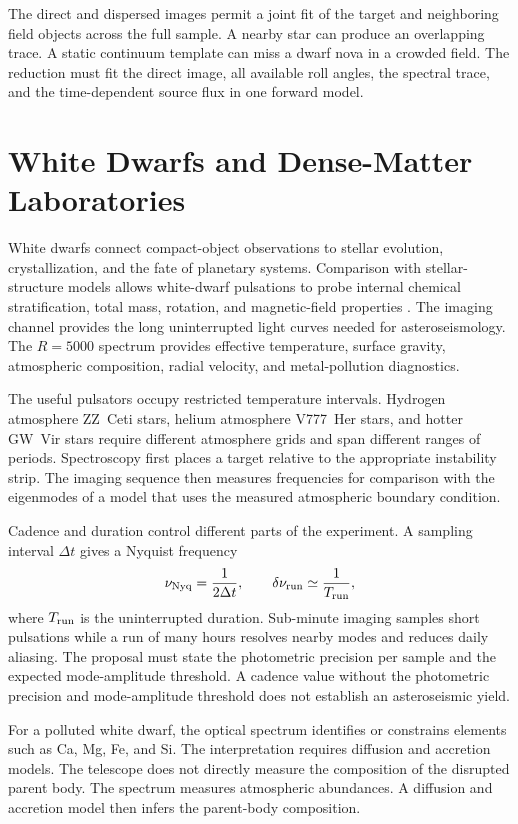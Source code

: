 \documentclass[10pt,onecolumn]{article}
\begin{document}
The direct and dispersed images permit a joint fit of the target and
neighboring field objects across the full sample. A nearby star can produce an
overlapping trace. A static continuum template can miss a dwarf nova in a
crowded field. The reduction must
fit the direct image, all available roll angles, the spectral trace,
and the time-dependent source flux in one forward model.

\section{White Dwarfs and Dense-Matter Laboratories}

White dwarfs connect compact-object observations to stellar evolution,
crystallization, and the fate of planetary systems. Comparison with
stellar-structure models allows white-dwarf pulsations to probe internal
chemical stratification, total mass, rotation, and magnetic-field properties
\cite{corsico2019}. The imaging channel provides the long uninterrupted light
curves needed for asteroseismology. The $R=5000$ spectrum provides effective
temperature, surface gravity, atmospheric composition, radial velocity, and
metal-pollution diagnostics.

The useful pulsators occupy restricted temperature intervals. Hydrogen
atmosphere ZZ~Ceti stars, helium atmosphere V777~Her stars, and hotter
GW~Vir stars require different atmosphere grids and span different ranges of
periods. Spectroscopy first places a target relative to the appropriate
instability strip. The imaging sequence then measures frequencies for
comparison with the eigenmodes of a model that uses the measured atmospheric
boundary condition.

Cadence and duration control different parts of the experiment. A sampling
interval $\Delta t$ gives a Nyquist frequency
\begin{equation}
 \nu_{\rm Nyq}=\frac{1}{2\Delta t},
 \qquad
 \delta\nu_{\rm run}\simeq\frac{1}{T_{\rm run}},
 \label{eq:wd_sampling}
\end{equation}
where $T_{\rm run}$ is the uninterrupted duration. Sub-minute imaging
samples short pulsations while a run of many hours resolves nearby modes and
reduces daily aliasing. The proposal must state the photometric precision per
sample and the expected mode-amplitude threshold. A cadence value without the
photometric precision and mode-amplitude threshold does not establish an
asteroseismic yield.

For a polluted white dwarf, the optical spectrum identifies or constrains
elements such as Ca, Mg, Fe, and Si. The interpretation requires diffusion and
accretion models. The telescope does not directly measure the composition of
the disrupted parent body. The spectrum measures atmospheric abundances. A
diffusion and accretion model then infers the parent-body composition.
\end{document}
